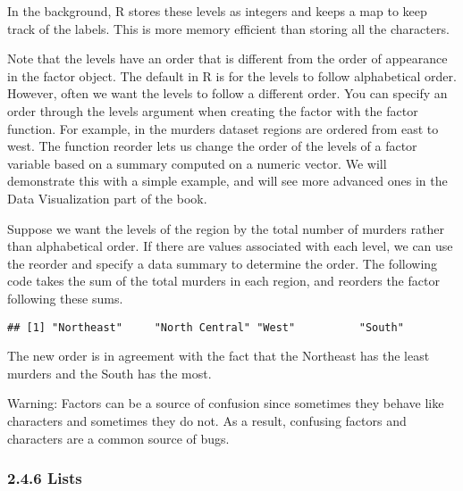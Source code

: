 \documentclass[
]{article}
\newenvironment{Shaded}{\begin{snugshade}}{\end{snugshade}}
\newcommand{\AttributeTok}[1]{\textcolor[rgb]{0.77,0.63,0.00}{#1}}
\newcommand{\FunctionTok}[1]{\textcolor[rgb]{0.00,0.00,0.00}{#1}}
\newcommand{\NormalTok}[1]{#1}
\newcommand{\OtherTok}[1]{\textcolor[rgb]{0.56,0.35,0.01}{#1}}
\newcommand{\SpecialCharTok}[1]{\textcolor[rgb]{0.00,0.00,0.00}{#1}}
\begin{document}
In the background, R stores these levels as integers and keeps a map to
keep track of the labels. This is more memory efficient than storing all
the characters.

Note that the levels have an order that is different from the order of
appearance in the factor object. The default in R is for the levels to
follow alphabetical order. However, often we want the levels to follow a
different order. You can specify an order through the levels argument
when creating the factor with the factor function. For example, in the
murders dataset regions are ordered from east to west. The function
reorder lets us change the order of the levels of a factor variable
based on a summary computed on a numeric vector. We will demonstrate
this with a simple example, and will see more advanced ones in the Data
Visualization part of the book.

Suppose we want the levels of the region by the total number of murders
rather than alphabetical order. If there are values associated with each
level, we can use the reorder and specify a data summary to determine
the order. The following code takes the sum of the total murders in each
region, and reorders the factor following these sums.

\begin{Shaded}
\end{Shaded}

\begin{verbatim}
## [1] "Northeast"     "North Central" "West"          "South"
\end{verbatim}

The new order is in agreement with the fact that the Northeast has the
least murders and the South has the most.

Warning: Factors can be a source of confusion since sometimes they
behave like characters and sometimes they do not. As a result, confusing
factors and characters are a common source of bugs.

\hypertarget{lists}{%
\subsubsection{2.4.6 Lists}\label{lists}}
\end{document}
